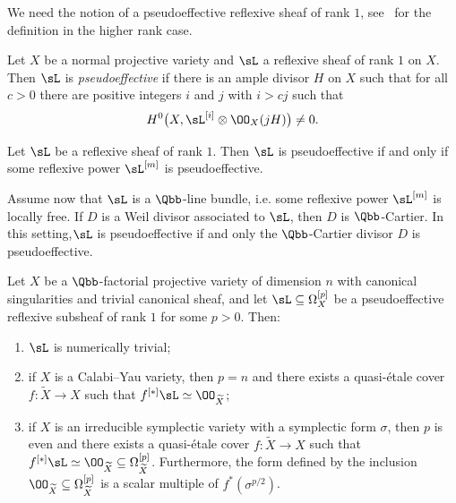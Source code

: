 We need the notion of a pseudoeffective reflexive sheaf of rank $1$, see~\cite[Definition~2.1]{HP17} for the definition in the higher rank case.


\begin{defi}\label{def:ps}
Let $X$ be a normal projective variety and $\sL$ a reflexive sheaf of rank $1$ on $X$. Then $\sL$ is \emph{pseudoeffective} if there is an ample divisor $H$ on $X$ such that for all $c > 0$ there are positive integers $i$ and $j$ with $i > cj$ such that
\[
H^0\big(X, \sL^{[i]} \otimes \OO_X(jH)\big) \neq 0.
\]
\end{defi}

\begin{rema}\label{rema:main2.5}
Let $\sL$ be a reflexive sheaf of rank $1$. Then $\sL$ is pseudoeffective if and only if some reflexive power $\sL^{[m]}$ is pseudoeffective.

Assume now that $\sL$ is a $\Qbb$-line bundle, i.e. some reflexive power $\sL^{[m]} $ is locally free. If $D$ is a Weil divisor associated to $\sL$, then $D$ is $\Qbb$-Cartier. In this setting,\linebreak$\sL$ is pseudoeffective if and only the $\Qbb$-Cartier divisor $D$ is pseudoeffective.
\end{rema}

\begin{lemm}\label{lem1}
Let $X$ be a $\Qbb$-factorial projective variety of dimension $n$ with canonical singularities and trivial canonical sheaf, and let $\sL \subseteq \Omega^{[p]}_X$ be a pseudoeffective reflexive subsheaf of rank $1$ for some $p > 0$. Then:
\begin{enumerate}\romanenumi
\item \label{list-2.6.1}$\sL$ is numerically trivial;
\item \label{list-2.6.2}if $X$ is a Calabi--Yau variety, then $p = n$ and there exists a quasi-étale cover $f\colon \widetilde X \to X$ such that $f^{[*]}\sL \simeq \OO_{\widetilde X}$;
\item \label{list-2.6.3}if $X$ is an irreducible symplectic variety with a symplectic form $\sigma$, then $p$ is even and there exists a quasi-étale cover $f\colon \widetilde X \to X$ such that $f^{[*]}\sL \simeq \OO_{\widetilde X}\subseteq \Omega^{[p]}_{\widetilde X}$. Furthermore, the form defined by the inclusion $\OO_{\widetilde X} \subseteq \Omega^{[p]}_{\widetilde X}$ is a scalar multiple of $f^*(\sigma^{p/2})$.
\end{enumerate}
\end{lemm}

